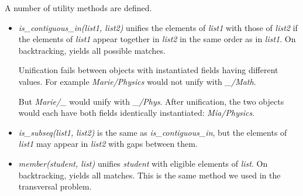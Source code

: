 A number of utility methods are defined.
\begin{itemize}
    \item \textit{is\_contiguous\_in(list1, list2)} unifies the elements of \textit{list1} with those of \textit{list2} if the elements of \textit{list1} appear together in \textit{list2} in the same order as in \textit{list1}. On backtracking, yields all possible matches. 
    
    \smallv
    Unification fails between objects with instantiated fields having different values. For example \textit{Marie/Physics} would not unify with \textit{\_/Math}.
    
    \smallv
    But \textit{Marie/\_} would unify with \textit{\_/Phys}. After unification, the two objects would each have both fields identically instantiated: \textit{Mia/Physics}.
    
    \item \textit{is\_subseq(list1, list2)} is the same as \textit{is\_contiguous\_in}, but the elements of \textit{list1} may appear in \textit{list2} with gaps between them.
    \item \textit{member(student, list)} unifies \textit{student} with eligible elements of \textit{list}. On backtracking, yields all matches. This is the same method we used in the transversal problem.
\end{itemize}

